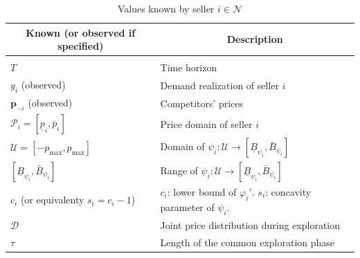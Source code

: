 \documentclass{article} %
\begin{document}
\begin{table}[h]
\caption{Values known by seller $i \in \mathcal{N}$}
\begin{center}
\begin{tabular}{ll}
\multicolumn{1}{c}{\bf Known (or observed if specified)}  &\multicolumn{1}{c}{\bf Description}
\\ \hline \\
$T$         & Time horizon \\
$y_i$  (observed)       & Demand realization of seller $i$ \\
$\mathbf{p}_{-i}$ (observed) & Competitors' prices \\
$\mathcal{P}_i = [\underline{p}_i,\bar{p}_i]$        & Price domain of seller $i$ \\
$\mathcal{U}=[-p_{\text{max}},p_{\text{max}}]$                   & Domain of $\psi_i:\mathcal{U} \to [\underline{B}_{\psi_i},\bar{B}_{\psi_i}]$ \\
$[\underline{B}_{\psi_i},\bar{B}_{\psi_i}]$                    & Range of $\psi_i:\mathcal{U} \to [\underline{B}_{\psi_i},\bar{B}_{\psi_i}]$ \\
$c_i$ (or equivalenty $s_i = c_i-1$)                   & $c_i$: lower bound of $\varphi_i'$. $s_i$: concavity parameter of $\psi_i$. \\
$\mathscr{D}$                  & Joint price distribution during exploration\\
$\tau$                  & Length of the common exploration phase
\end{tabular}
\end{center}
\end{table}
\end{document}
